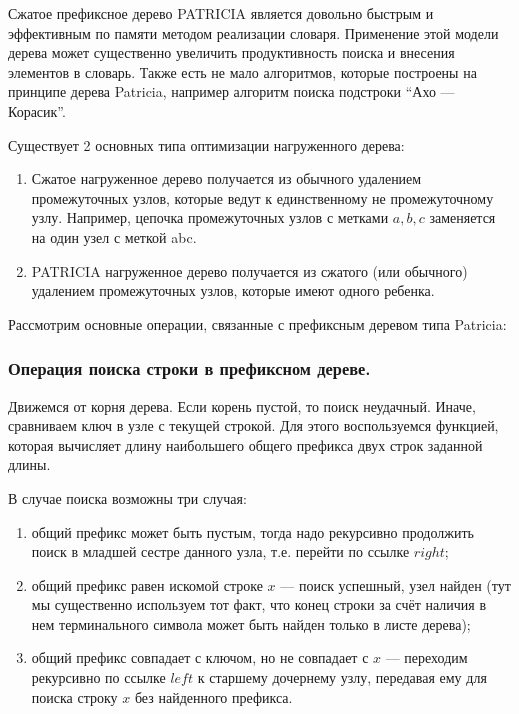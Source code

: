 \documentclass[12pt]{article}
\begin{document}
Сжатое префиксное дерево PATRICIA является довольно быстрым и эффективным по памяти методом реализации словаря. Применение этой модели дерева может существенно увеличить продуктивность поиска и внесения элементов в словарь. Также есть не мало алгоритмов, которые построены на принципе дерева Patricia, например алгоритм поиска подстроки ``Ахо — Корасик''.

\smallbreak
Существует 2 основных типа оптимизации нагруженного дерева:


\begin{enumerate}
	\item Сжатое нагруженное дерево получается из обычного удалением промежуточных узлов, которые ведут к единственному не промежуточному узлу. Например, цепочка промежуточных узлов с метками $a, b, c$ заменяется на один узел с меткой abc.
	\item PATRICIA нагруженное дерево получается из сжатого (или обычного) удалением промежуточных узлов, которые имеют одного ребенка.
\end{enumerate}

Рассмотрим основные операции, связанные с префиксным деревом типа Patricia:

\subsubsection*{Операция поиска строки в префиксном дереве.}
Движемся от корня дерева. Если корень пустой, то поиск неудачный. Иначе, сравниваем ключ в узле с текущей строкой. Для этого воспользуемся функцией, которая вычисляет длину наибольшего общего префикса двух строк заданной длины.

\smallbreak
В случае поиска возможны три случая: 
\begin{enumerate}
	\item общий префикс может быть пустым, тогда надо рекурсивно продолжить поиск в младшей сестре данного узла, т.е. перейти по ссылке $right$;
	\item общий префикс равен искомой строке $x$ — поиск успешный, узел найден (тут мы существенно используем тот факт, что конец строки за счёт наличия в нем терминального символа может быть найден только в листе дерева);
	\item общий префикс совпадает с ключом, но не совпадает с $x$ — переходим рекурсивно по ссылке $left$ к старшему дочернему узлу, передавая ему для поиска строку $x$ без найденного префикса.
\end{enumerate}
\end{document}
